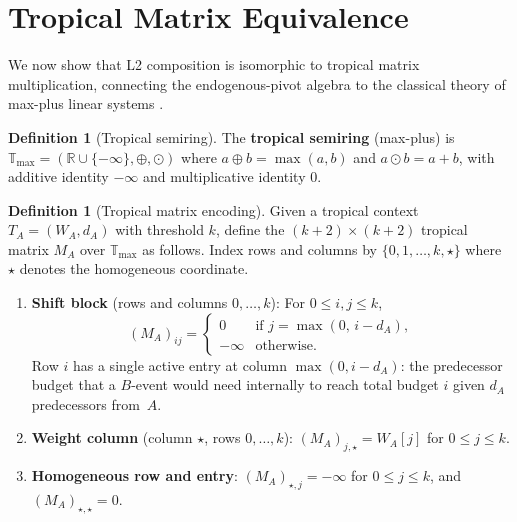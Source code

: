 \documentclass[11pt]{article}
\theoremstyle{plain}
\theoremstyle{definition}
\newtheorem{definition}[theorem]{Definition}
\theoremstyle{remark}
\newcommand{\R}{\mathbb{R}}
\newcommand{\Tmax}{\mathbb{T}_{\max}}
\begin{document}
\section{Tropical Matrix Equivalence}\label{sec:tropical-matrix}

We now show that L2 composition is isomorphic to tropical matrix
multiplication, connecting the endogenous-pivot algebra to the
classical theory of max-plus linear systems
\cite{baccelli1992synchronization}.

\begin{definition}[Tropical semiring]\label{def:tropical-semiring}
The \textbf{tropical semiring} (max-plus) is
$\Tmax = (\R \cup \{-\infty\}, \oplus, \odot)$ where $a \oplus b =
\max(a,b)$ and $a \odot b = a + b$, with additive identity $-\infty$
and multiplicative identity $0$.
\end{definition}

\begin{definition}[Tropical matrix encoding]\label{def:tropical-matrix}
Given a tropical context $T_A = (W_A, d_A)$ with threshold $k$,
define the $(k{+}2) \times (k{+}2)$ tropical matrix $M_A$ over
$\Tmax$ as follows.  Index rows and columns by $\{0, 1, \ldots, k, \star\}$
where $\star$ denotes the homogeneous coordinate.

\begin{enumerate}[label=(\roman*),nosep]
  \item \textbf{Shift block} (rows and columns $0, \ldots, k$):
    For $0 \le i, j \le k$,
    \[
      (M_A)_{ij} = \begin{cases}
        0 & \text{if } j = \max(0,\, i - d_A),\\
        -\infty & \text{otherwise}.
      \end{cases}
    \]
    Row $i$ has a single active entry at column $\max(0, i - d_A)$:
    the predecessor budget that a $B$-event would need internally to
    reach total budget $i$ given $d_A$ predecessors from~$A$.

  \item \textbf{Weight column} (column $\star$, rows $0, \ldots, k$):
    $(M_A)_{j,\star} = W_A[j]$ for $0 \le j \le k$.

  \item \textbf{Homogeneous row and entry}:
    $(M_A)_{\star,j} = -\infty$ for $0 \le j \le k$, and
    $(M_A)_{\star,\star} = 0$.
\end{enumerate}
\end{definition}
\end{document}
